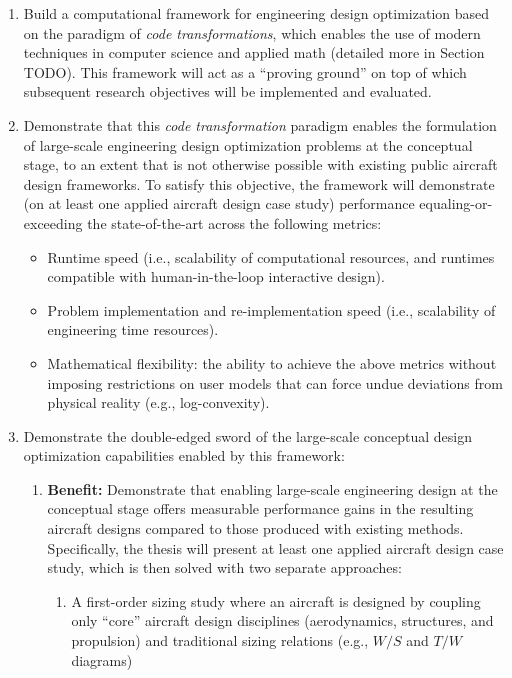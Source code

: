 \documentclass[12pt,vi,twoside]{article}
\begin{document}
    \begin{enumerate}
        \item Build a computational framework for engineering design optimization based on the paradigm of \textit{code transformations}, which enables the use of modern techniques in computer science and applied math (detailed more in Section TODO). This framework will act as a ``proving ground'' on top of which subsequent research objectives will be implemented and evaluated.
        \item Demonstrate that this \textit{code transformation} paradigm enables the formulation of large-scale engineering design optimization problems at the conceptual stage, to an extent that is not otherwise possible with existing public aircraft design frameworks. To satisfy this objective, the framework will demonstrate (on at least one applied aircraft design case study) performance equaling-or-exceeding the state-of-the-art across the following metrics:
        \begin{itemize}
            \item Runtime speed (i.e., scalability of computational resources, and runtimes compatible with human-in-the-loop interactive design).
            \item Problem implementation and re-implementation speed (i.e., scalability of engineering time resources).
            \item Mathematical flexibility: the ability to achieve the above metrics without imposing restrictions on user models that can force undue deviations from physical reality (e.g., log-convexity).
        \end{itemize}
        \item Demonstrate the double-edged sword of the large-scale conceptual design optimization capabilities enabled by this framework:
        \begin{enumerate}
            \item \textbf{Benefit:} Demonstrate that enabling large-scale engineering design at the conceptual stage offers measurable performance gains in the resulting aircraft designs compared to those produced with existing methods. Specifically, the thesis will present at least one applied aircraft design case study, which is then solved with two separate approaches:
            \begin{enumerate}
                \item A first-order sizing study where an aircraft is designed by coupling only ``core'' aircraft design disciplines (aerodynamics, structures, and propulsion) and traditional sizing relations (e.g., $W/S$ and $T/W$ diagrams)

\end{enumerate}
\end{enumerate}
\end{enumerate}
\end{document}

